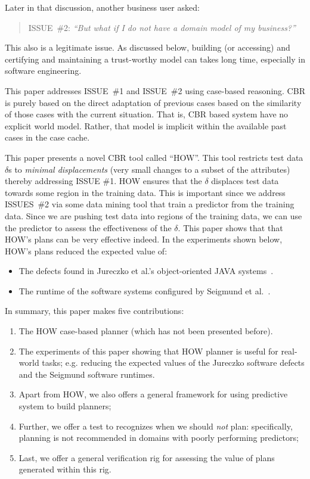 \documentclass[conference]{IEEEtran}
\newcommand{\bi}{\begin{itemize}}
\newcommand{\ei}{\end{itemize}}
\newcommand{\be}{\begin{enumerate}}
\newcommand{\ee}{\end{enumerate}}
\begin{document}
Later in that discussion, another business user asked:
\begin{quote}
ISSUE~\#2: {\em ``But what if I do not have a domain model of my business?''}
\end{quote}
This also is a legitimate issue.
As discussed below,
building (or accessing) and certifying and maintaining a 
trust-worthy model  can  takes  long time, especially in software engineering. 

This paper addresses  ISSUE~\#1 and ISSUE~\#2 using case-based reasoning.
CBR  is purely based on the direct
adaptation of previous cases based on the similarity of
those cases with the current situation. That is, 
CBR based system have no explicit world model.
Rather, that model is implicit within  the available past
cases in the case cache. 

This paper presents a novel CBR tool called ``HOW''. This tool  restricts test data $\delta$s to {\em minimal
displacements} (very small changes to a subset of the attributes)
thereby addressing ISSUE \#1. 
HOW ensures that the   $\delta$ displaces test data towards some region in the training data.
This is important since we address ISSUES~\#2 via some data mining
tool that train  a predictor from the training  data. Since we are pushing test data
into regions of the training data,  we can use the predictor to assess
the effectiveness of the $\delta$.
This paper shows that  that HOW's plans can be very effective indeed.
In the experiments shown below, HOW's plans
reduced the  expected
value of:
\bi
\item The  defects found  in Jureczko et al.'s    object-oriented JAVA systems~\cite{jureczko10}.
\item The runtime of the  software systems   configured by  Seigmund et al.~\cite{sven12}.
\ei 
In summary, this paper makes five contributions:
\be
\item The HOW  case-based planner (which has not been presented before).
\item The experiments of this paper showing that HOW planner is useful for real-world tasks;
e.g. reducing the
expected values of the Jureczko software defects and the Seigmund software runtimes.
\item Apart from HOW, we  also offers a general framework for using  predictive system to build planners;
\item Further, we offer a  test to recognizes  when we should {\em not}  plan: specifically,
planning is
not recommended in domains with  poorly performing predictors;
\item Last, we  offer a general verification rig for assessing the value of plans generated within this rig.
\ee 
\end{document}
